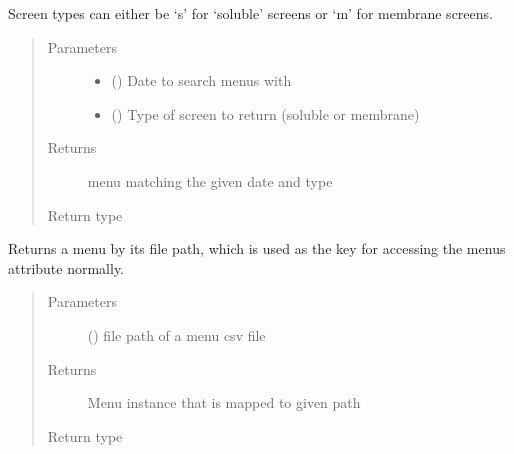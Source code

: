 \documentclass[letterpaper,10pt,english]{sphinxmanual}
\begin{document}
\begin{fulllineitems}
\begin{fulllineitems}
Screen types can either be ‘s’ for ‘soluble’ screens or ‘m’ for
membrane screens.
\begin{quote}\begin{description}
\item[{Parameters}] \leavevmode\begin{itemize}
\item {} 
 () \textendash{} Date to search menus with

\item {} 
 () \textendash{} Type of screen to return (soluble or membrane)

\end{itemize}

\item[{Returns}] \leavevmode
menu matching the given date and type

\item[{Return type}] \leavevmode
{\hyperref[\detokenize{polo.utils:polo.utils.io_utils.Menu}]{}}

\end{description}\end{quote}

\end{fulllineitems}


\begin{fulllineitems}
\label{\detokenize{polo.utils:polo.utils.io_utils.BarTender.get_menu_by_path}}
Returns a menu by its file path, which is used as the key
for accessing the menus attribute normally.
\begin{quote}\begin{description}
\item[{Parameters}] \leavevmode
{} () \textendash{} file path of a menu csv file

\item[{Returns}] \leavevmode
Menu instance that is mapped to given path

\item[{Return type}] \leavevmode
{\hyperref[\detokenize{polo.utils:polo.utils.io_utils.Menu}]{}}


\end{description}
\end{quote}
\end{fulllineitems}
\end{fulllineitems}
\end{document}
